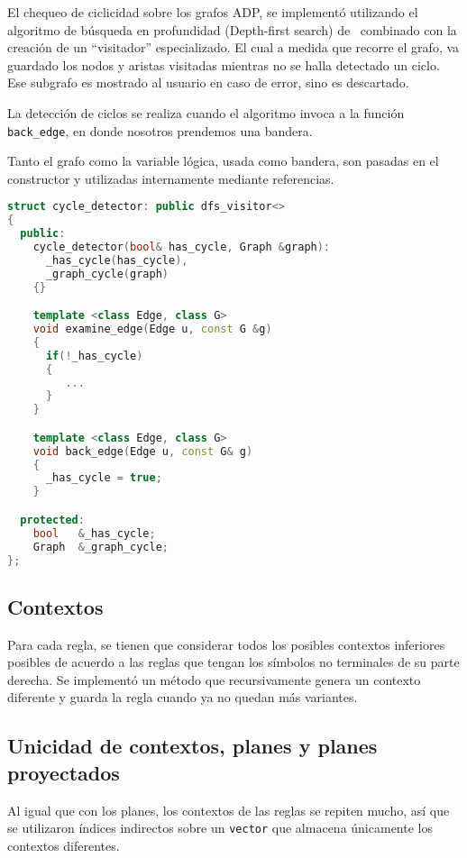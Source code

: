 El chequeo de ciclicidad sobre los grafos ADP, se implementó utilizando el algoritmo de búsqueda en profundidad (Depth-first search) de \boost\ combinado con la creación de un ``visitador'' especializado. El cual a medida que recorre el grafo, va guardado los nodos y aristas visitadas mientras no se halla detectado un ciclo. Ese subgrafo es mostrado al usuario en caso de error, sino es descartado.

La detección de ciclos se realiza cuando el algoritmo invoca a la función \texttt{back\_edge}, en donde nosotros prendemos una bandera.

Tanto el grafo como la variable lógica, usada como bandera, son pasadas en el constructor y utilizadas internamente mediante referencias.

\begin{lstlisting}[language=C++, basicstyle=\scriptsize, columns=fullflexible, linewidth=8.5cm]
struct cycle_detector: public dfs_visitor<>
{
  public:
    cycle_detector(bool& has_cycle, Graph &graph):
      _has_cycle(has_cycle), 
      _graph_cycle(graph)
    {}

    template <class Edge, class G>
    void examine_edge(Edge u, const G &g)
    {
      if(!_has_cycle)
      {
         ...
      }
    }

    template <class Edge, class G>
    void back_edge(Edge u, const G& g)
    {
      _has_cycle = true;
    }

  protected:
    bool   &_has_cycle;
    Graph  &_graph_cycle;
};
\end{lstlisting}

\subsection*{Contextos}

Para cada regla, se tienen que considerar todos los posibles contextos inferiores posibles de acuerdo a las reglas que tengan los símbolos no terminales de su parte derecha. Se implementó un método que recursivamente genera un contexto diferente y guarda la regla cuando ya no quedan más variantes.

\subsection*{Unicidad de contextos, planes y planes proyectados}

Al igual que con los planes, los contextos de las reglas se repiten mucho, así que se utilizaron índices indirectos sobre un \texttt{vector} que almacena únicamente los contextos diferentes.

